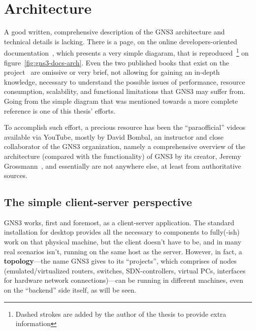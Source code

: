 \section{Architecture}
\label{sec:gns3architecture}

A good written, comprehensive description of the GNS3 architecture and technical details is lacking.
There is a page, on the online developers-oriented documentation~\cite{gns3devarch}, which presents a very simple diagaram, that is reproduced~\footnote{Dashed strokes are added by the author of the thesis to provide extra information} on figure~\ref{fig:gns3-docs-arch}.
Even the two published books that exist on the project~\cite{gns3netsimguide,thebookofgns3} are omissive or very brief, not allowing for gaining an in-depth knowledge, necessary to understand the possible issues of performance, resource consumption, scalability, and functional limitations that GNS3 may suffer from.
Going from the simple diagram that was mentioned towards a more complete reference is one of this thesis' efforts.

To accomplish such effort, a precious resource has been the ``paraofficial'' videos available via YouTube, mostly by David Bombal, an instructor and close collaborator of the GNS3 organization, namely a comprehensive overview of the architecture (compared with the functionality) of GNS3 by its creator, Jeremy Grossmann~\cite{ytgns3arch22}, and essentially are not anywhere else, at least from authoritative sources. %



\subsection{The simple client-server perspective}
\label{subsec:gns3clientserver}

GNS3 works, first and foremost, as a client-server application.
The standard installation for desktop provides all the necessary to components to fully(-ish) work on that physical machine, but the client doesn't have to be, and in many real scenarios isn't, running on the same host as the server.
However, in fact, a \textbf{topology}---the name GNS3 gives to its ``projects'', which comprises of nodes (emulated/virtualized routers, switches, SDN-controllers, virtual PCs, interfaces for hardware network connections)---can be running in different machines, even on the ``backend'' side itself, as will be seen.


